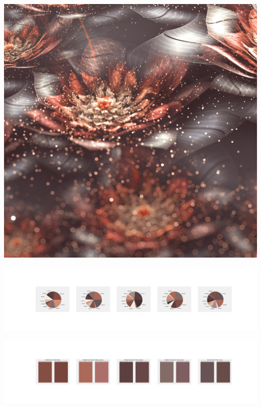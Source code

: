 \documentclass[11pt]{article}
\begin{document}
\begin{landscape}
    \begin{center}
    \includegraphics[width=\textwidth]{./nbimg/file (390).jpg}
    \end{center}

    \begin{center}
    \includegraphics[width=250mm]{./nbimg/pie-323.jpg}
    \end{center}

    \begin{center}
    \includegraphics[width=250mm]{./nbimg/peak-323.jpg}
    \end{center}
    


\end{landscape}
\end{document}
